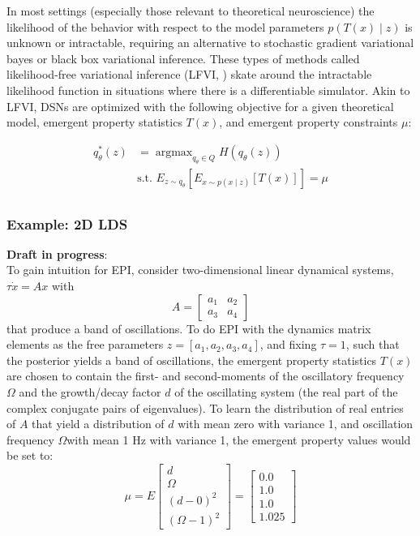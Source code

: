 \documentclass[11pt]{article}
\DeclareMathOperator*{\argmax}{argmax}
\begin{document}
In most settings (especially those relevant to theoretical neuroscience) the likelihood of the behavior with respect to the model parameters $p(T(x) \mid z)$ is unknown or intractable, requiring an alternative to stochastic gradient variational bayes \cite{kingma2013auto} or black box variational inference\cite{ranganath2014black}.  These types of methods called likelihood-free variational inference (LFVI, \cite{tran2017hierarchical}) skate around the intractable likelihood function in situations where there is a differentiable simulator. Akin to LFVI, DSNs are optimized with the following objective for a given theoretical model, emergent property statistics $T(x)$, and emergent property constraints $\mu$:

\begin{equation}
\begin{split}
q_\theta^*(z) &= \argmax_{q_\theta \in Q} H(q_\theta(z)) \\
 &  \text{s.t.  } E_{z \sim q_\theta}\left[ E_{x\sim p(x \mid z)}\left[T(x)\right] \right] = \mu \\
 \end{split}
\end{equation}

\subsubsection{Example: 2D LDS}\label{methods_2DLDS}
\textbf{Draft in progress}: \\
To gain intuition for EPI, consider two-dimensional linear dynamical systems, $\tau \dot{x} = Ax$ with 
\[A = \begin{bmatrix} a_1 & a_2 \\ a_3 & a_4 \end{bmatrix}\]
 that produce a band of oscillations. To do EPI with the dynamics matrix elements as the free parameters $z = \left[a_1, a_2, a_3, a_4 \right]$, and fixing $\tau=1$, such that the posterior yields a band of oscillations, the emergent property statistics $T(x)$ are chosen to contain the first- and second-moments of the oscillatory frequency $\Omega$ and the growth/decay factor $d$ of the oscillating system (the real part of the complex conjugate pairs of eigenvalues).  To learn the distribution of real entries of $A$ that yield a distribution of $d$ with mean zero with variance 1, and oscillation frequency $\Omega$with mean 1 Hz with variance 1, the emergent property values would be set to:
\begin{equation}
 \mu = E \begin{bmatrix} d \\ \Omega \\ (d-0)^2 \\ (\Omega-1)^2 \end{bmatrix} = \begin{bmatrix} 0.0 \\ 1.0 \\ 1.0 \\ 1.025 \end{bmatrix}
 \end{equation} 
 
\end{document}
